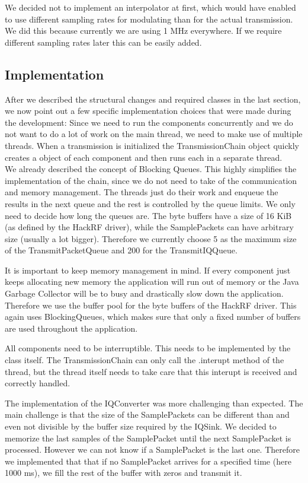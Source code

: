 We decided not to implement an interpolator at first, which would have enabled to use different sampling rates for modulating than for the actual transmission. We did this because currently we are using 1 MHz everywhere. If we require different sampling rates later this can be easily added. 

\subsection{Implementation}

After we described the structural changes and required classes in the last section, we now point out a few specific implementation choices that were made during the development: 
Since we need to run the components concurrently and we do not want to do a lot of work on the main thread, we need to make use of multiple threads. When a transmission is initialized the TransmissionChain object quickly creates a object of each component and then runs each in a separate thread. \\
We already described the concept of Blocking Queues. This highly simplifies the implementation of the chain, since we do not need to take of the communication and memory management. The threads just do their work and enqueue the results in the next queue and the rest is controlled by the queue limits. We only need to decide how long the queues are. The byte buffers have a size of 16 KiB (as defined by the HackRF driver), while the SamplePackets can have arbitrary size (usually a lot bigger). Therefore we currently choose 5 as the maximum size of the TransmitPacketQueue and 200 for the TransmitIQQueue.  
	
It is important to keep memory management in mind. If every component just keeps allocating new memory the application will run out of memory or the Java Garbage Collector will be to busy and drastically slow down the application. Therefore we use the buffer pool for the byte buffers of the HackRF driver. This again uses BlockingQueues, which makes sure that only a fixed number of buffers are used throughout the application.  
	
All components need to be interruptible. This needs to be implemented by the class itself. The TransmissionChain can only call the .interupt method of the thread, but the thread itself needs to take care that this interupt is received and correctly handled. 
	
The implementation of the IQConverter was more challenging than expected. The main challenge is that the size of the SamplePackets can be different than and even not divisible by the buffer size required by the IQSink. We decided to memorize the last samples of the SamplePacket until the next SamplePacket is processed. However we can not know if a SamplePacket is the last one. Therefore we implemented that that if no SamplePacket arrives for a specified time (here 1000 ms), we fill the rest of the buffer with zeros and transmit it. 


